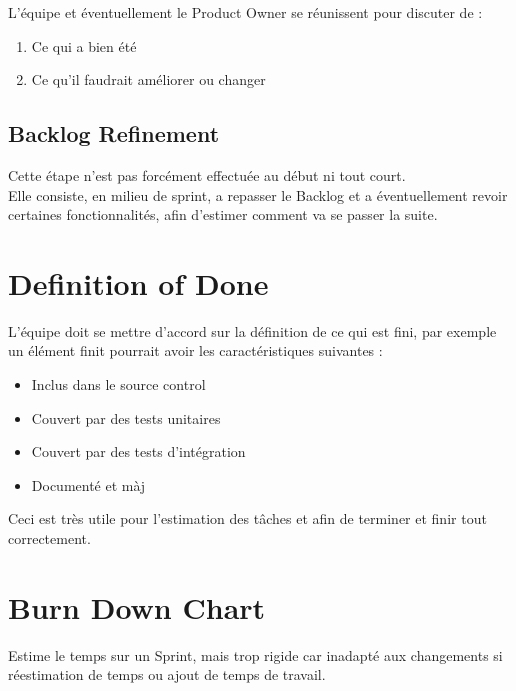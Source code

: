 \documentclass{report}
\begin{document}
			L'équipe et éventuellement le Product Owner se réunissent pour discuter de : \\

			\begin{enumerate}
				\item Ce qui a bien été
				\item Ce qu'il faudrait améliorer ou changer
			\end{enumerate}

		\subsection{Backlog Refinement}

			Cette étape n'est pas forcément effectuée au début ni tout court.\\

			Elle consiste, en milieu de sprint, a repasser le Backlog et a éventuellement revoir certaines fonctionnalités, afin d'estimer comment va se passer la suite.\\

	\section{Definition of Done}

		L'équipe doit se mettre d'accord sur la définition de ce qui est fini, par exemple un élément finit pourrait avoir les caractéristiques suivantes : \\

		\begin{itemize}
			\item Inclus dans le source control
			\item Couvert par des tests unitaires
			\item Couvert par des tests d'intégration
			\item Documenté et màj\\
		\end{itemize}

		Ceci est très utile pour l'estimation des tâches et afin de terminer et finir tout correctement.\\

	\section{Burn Down Chart}

		Estime le temps sur un Sprint, mais trop rigide car inadapté aux changements si réestimation de temps ou ajout de temps de travail.\\
\end{document}
